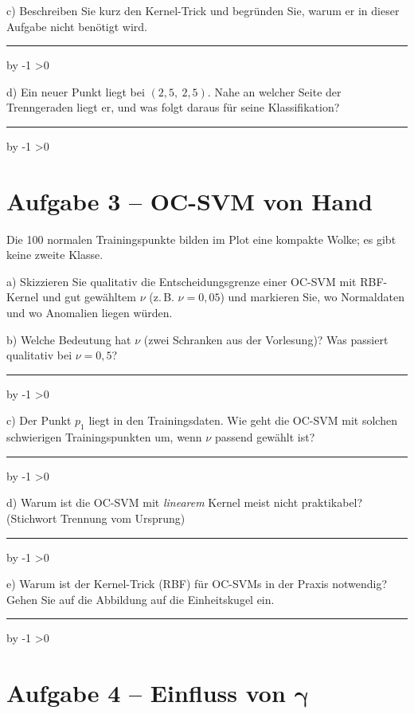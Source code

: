 \documentclass[10pt,a4paper]{article}
\newcommand{\antwortlinien}[1]{%
  \par\vspace{2pt}%
  \newcount\zeilen \zeilen=#1
  \loop
    \noindent\rule{\linewidth}{0.4pt}\par\vspace{11pt}%
    \advance\zeilen by -1
  \ifnum\zeilen>0 \repeat
}
\begin{document}
c) Beschreiben Sie kurz den Kernel-Trick und begründen Sie, warum er in dieser Aufgabe
nicht benötigt wird.
\antwortlinien{3}

d) Ein neuer Punkt liegt bei $(2{,}5,\ 2{,}5)$. Nahe an welcher Seite der Trenngeraden liegt
er, und was folgt daraus für seine Klassifikation?
\antwortlinien{2}

\section*{Aufgabe 3 -- OC-SVM von Hand}

Die 100 normalen Trainingspunkte bilden im Plot eine kompakte Wolke; es gibt keine
zweite Klasse.

\begin{center}
\end{center}

a) Skizzieren Sie qualitativ die Entscheidungsgrenze einer OC-SVM mit RBF-Kernel und gut
gewähltem $\nu$ (z.\,B. $\nu = 0{,}05$) und markieren Sie, wo Normaldaten und wo Anomalien
liegen würden.

b) Welche Bedeutung hat $\nu$ (zwei Schranken aus der Vorlesung)? Was passiert qualitativ
bei $\nu = 0{,}5$?
\antwortlinien{4}

c) Der Punkt $p_1$ liegt in den Trainingsdaten. Wie geht die OC-SVM mit solchen
\glqq schwierigen\grqq{} Trainingspunkten um, wenn $\nu$ passend gewählt ist?
\antwortlinien{2}

d) Warum ist die OC-SVM mit \emph{linearem} Kernel meist nicht praktikabel?
(Stichwort Trennung vom Ursprung)
\antwortlinien{3}

e) Warum ist der Kernel-Trick (RBF) für OC-SVMs in der Praxis notwendig?
Gehen Sie auf die Abbildung auf die Einheitskugel ein.
\antwortlinien{4}

\section*{Aufgabe 4 -- Einfluss von $\boldsymbol{\gamma}$}
\end{document}
